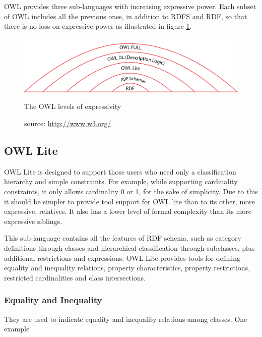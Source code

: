 OWL provides three sub-languages with increasing expressive power. Each subset of OWL includes all the previous ones, in addition to RDFS and RDF, so that there is no loss on expressive power as illustrated in figure \ref{fig:owlstack}.

\begin{figure}[h]
  \centering
  \includegraphics[width=.8\textwidth]{fig/owl-stack}
  \caption{The OWL levels of expressivity}
  \caption*{source: \url{http://www.w3.org/}}
  \label{fig:owlstack}
\end{figure} 


\subsection*{OWL Lite}

OWL Lite is designed to support those users who need only a classification hierarchy and simple constraints. For example, while supporting cardinality constraints, it only allows cardinality 0 or 1, for the sake of simplicity. Due to this it should be simpler to provide tool support for OWL lite than to its other, more expressive, relatives. It also has a lower level of formal complexity than its more expressive siblings.

This sub-language contains all the features of RDF schema, such as category definitions through classes and hierarchical classification through subclasses, plus additional restrictions and expressions. OWL Lite provides tools for defining equality and inequality relations, property characteristics, property restrictions, restricted cardinalities and class intersections.

\subsubsection*{Equality and Inequality}

They are used to indicate equality and inequality relations among classes. One example

